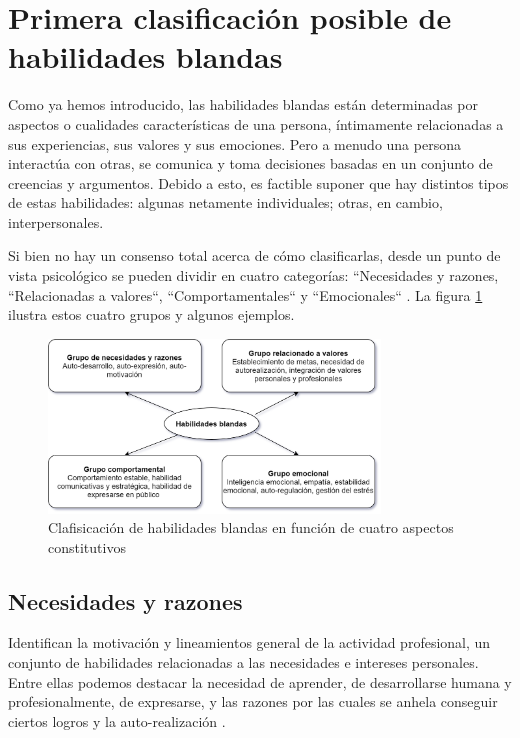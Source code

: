 \documentclass[conference]{IEEEtran}
\begin{document}




\section{Primera clasificación posible de habilidades blandas}
\label{scrivauto:4}

Como ya hemos introducido, las habilidades blandas están determinadas por aspectos o cualidades características de una persona, íntimamente relacionadas a sus experiencias, sus valores y sus emociones. Pero a menudo una persona interactúa con otras, se comunica y toma decisiones basadas en un conjunto de creencias y argumentos. Debido a esto, es factible suponer que hay distintos tipos de estas habilidades: algunas netamente individuales; otras, en cambio, interpersonales.

Si bien no hay un consenso total acerca de cómo clasificarlas, desde un punto de vista psicológico se pueden dividir en cuatro categorías: ``Necesidades y razones, ``Relacionadas a valores``, ``Comportamentales`` y ``Emocionales`` \cite{b7}. La figura \ref{fig:tipos_soft_skills} ilustra estos cuatro grupos y algunos ejemplos.



\begin{figure}[htbp]
\centering
\includegraphics[width=250pt,height=131pt]{Grupos_Soft_skills.png}

\caption{Clafisicación de habilidades blandas en función de cuatro aspectos constitutivos \cite{b7}}
\label{fig:tipos_soft_skills}
\end{figure}

\subsection{Necesidades y razones}
\label{scrivauto:5}

Identifican la motivación y lineamientos general de la actividad profesional, un conjunto de habilidades relacionadas a las necesidades e intereses personales. Entre ellas podemos destacar la necesidad de aprender, de desarrollarse humana y profesionalmente, de expresarse, y las razones por las cuales se anhela conseguir ciertos logros y la auto-realización \cite{b7}.
\end{document}
